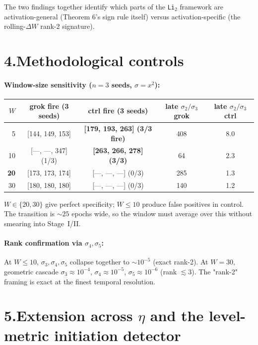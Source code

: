 \documentclass[11pt]{article}
\begin{document}
The two findings together identify which parts of the \texttt{Li}$_2$
framework are activation-general (Theorem 6's sign rule itself) versus
activation-specific (the rolling-$\Delta W$ rank-2 signature).

\section*{4.\quad Methodological controls}
\vspace{-0.4em}

\paragraph{Window-size sensitivity ($n=3$ seeds, $\sigma=x^2$):}
\begin{center}\small
\begin{tabular}{rcccc}
\toprule
$W$ & grok fire (3 seeds) & ctrl fire (3 seeds) & late $\sigma_2/\sigma_3$ grok & late $\sigma_2/\sigma_3$ ctrl \\
\midrule
5  & [144, 149, 153] & \textbf{[179, 193, 263] (3/3 fire)} & 408 & 8.0 \\
10 & [---, ---, 347] (1/3) & \textbf{[263, 266, 278] (3/3)} & 64  & 2.3 \\
\textbf{20} & [173, 173, 174] & [---, ---, ---] (0/3) & 285 & 1.3 \\
30 & [180, 180, 180] & [---, ---, ---] (0/3) & 140 & 1.2 \\
\bottomrule
\end{tabular}
\end{center}
$W \in \{20, 30\}$ give perfect specificity; $W \le 10$ produce false
positives in control. The transition is $\sim 25$ epochs wide, so the
window must average over this without smearing into Stage~I/II.

\paragraph{Rank confirmation via $\sigma_4, \sigma_5$:} At $W \le 10$,
$\sigma_3, \sigma_4, \sigma_5$ collapse together to $\sim 10^{-5}$
(exact rank-2). At $W=30$, geometric cascade $\sigma_3 \approx 10^{-4}$,
$\sigma_4 \approx 10^{-5}$, $\sigma_5 \approx 10^{-6}$ (rank $\lesssim 3$).
The "rank-2" framing is exact at the finest temporal resolution.

\section*{5.\quad Extension across $\eta$ and the level-metric initiation detector}
\vspace{-0.4em}
\end{document}
